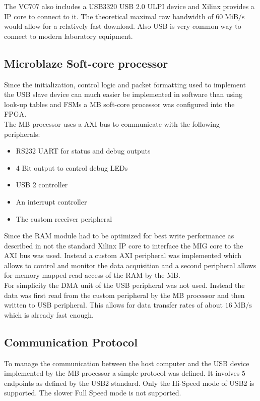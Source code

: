 The VC707 also includes a USB3320 USB 2.0 ULPI device and Xilinx provides
a \gls{IP} core to connect to it. The theoretical maximal
raw bandwidth of $60 \;\text{MiB}/\text{s}$ would allow for a relatively fast
download. Also \gls{USB} is very common way to connect to modern laboratory
equipment.

\subsection{Microblaze Soft-core processor}
Since the initialization, control logic and packet formatting
used to implement the \gls{USB} slave device can much easier be implemented
in software than using look-up tables and \glspl{FSM} a
\gls{MB} soft-core processor was configured into the \gls{FPGA}. \\

The \gls{MB} processor uses a \gls{AXI} bus to communicate with the following
peripherals:
\begin{itemize}
\item RS232 \gls{UART} for status and debug outputs
\item 4 Bit output to control debug \glspl{LED}
\item USB 2 controller
\item An interrupt controller
\item The custom receiver peripheral
\end{itemize}

Since the \gls{RAM} module had to be optimized for best write performance
as described in  not the standard Xilinx \gls{IP}
core to interface the \gls{MIG} core to the \gls{AXI} bus was used.
Instead a custom \gls{AXI} peripheral was implemented which allows to
control and monitor the data acquisition and a second peripheral allows
for memory mapped read access of the \gls{RAM} by the \gls{MB}. \\

For simplicity the \gls{DMA} unit of the \gls{USB} peripheral was not used.
Instead the data was first read from the custom peripheral
by the \gls{MB} processor and then written to \gls{USB} peripheral.
This allows for data transfer rates of about $16 \;\text{MB} / \text{s}$
which is already fast enough. \\

\subsection{Communication Protocol}
To manage the communication between the host computer and the \gls{USB} device
implemented by the \gls{MB} processor a simple protocol was defined.
It involves 5 endpoints as defined by the \gls{USB}2 standard.
Only the Hi-Speed mode of \gls{USB}2 is supported. The slower Full Speed mode
is not supported. \\

